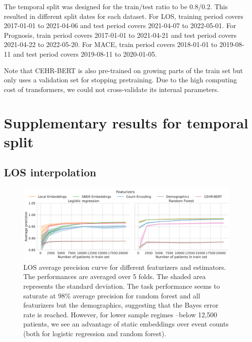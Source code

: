 \documentclass[french,12pt,twoside,a4paper]{book}
\begin{document}
\begin{appendices}
  The temporal split was designed for the train/test ratio to be 0.8/0.2. This
  resulted in different split dates for each dataset. For LOS, training period
  covers 2017-01-01 to 2021-04-06 and test period covers 2021-04-07 to 2022-05-01.
  For Prognosis, train period covers 2017-01-01 to 2021-04-21 and test period
  covers 2021-04-22 to 2022-05-20. For MACE, train period covers 2018-01-01 to
  2019-08-11 and test period covers 2019-08-11 to 2020-01-05.

  Note that CEHR-BERT is also pre-trained on growing parts of the train
  set but only uses a validation set for stopping pretraining. Due to the high
  computing cost of transformers, we could not cross-validate its internal
  parameters.


  \section{Supplementary results for temporal split}\label{apd:temporal_split}

  \subsection{LOS interpolation}\label{apd:temporal_split:los}

  \begin{figure}[!h]
    \centering
    \includegraphics[width=\linewidth]{img/chapter_3/los/average_precision_score_performances.pdf}
    \caption{LOS average precision curve for different featurizers and estimators.
      The performances are averaged over 5 folds. The shaded area represents the
      standard deviation. The task performance seems to saturate at 98\% average
      precision for random forest and all featurizers but the demographics,
      suggesting that the Bayes error rate is reached. However, for lower sample
      regimes --below 12,500 patients, we see an advantage of static embeddings
      over event counts (both for logistic regression and random forest).}%
    \label{fig:los_auprc}
  \end{figure}




\end{appendices}
\end{document}
